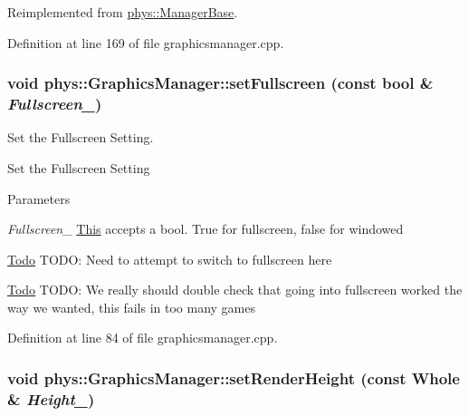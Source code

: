 Reimplemented from \hyperlink{classphys_1_1ManagerBase_afc3572602f96bdeb8215c386ff870820}{phys::ManagerBase}.



Definition at line 169 of file graphicsmanager.cpp.

\hypertarget{classphys_1_1GraphicsManager_aafcf1824190e44d42a9bfbea9cfbe1b2}{
\subsubsection[{setFullscreen}]{\setlength{\rightskip}{0pt plus 5cm}void phys::GraphicsManager::setFullscreen (const bool \& {\em Fullscreen\_\-})}}
\label{dd/d63/classphys_1_1GraphicsManager_aafcf1824190e44d42a9bfbea9cfbe1b2}


Set the Fullscreen Setting. 

Set the Fullscreen Setting 
\begin{DoxyParams}{Parameters}
\item[{\em Fullscreen\_\-}]\hyperlink{structThis}{This} accepts a bool. True for fullscreen, false for windowed \end{DoxyParams}


\begin{Desc}
\item[\hyperlink{todo__todo000009}{Todo}]TODO: Need to attempt to switch to fullscreen here \end{Desc}
\begin{Desc}
\item[\hyperlink{todo__todo000010}{Todo}]TODO: We really should double check that going into fullscreen worked the way we wanted, this fails in too many games \end{Desc}




Definition at line 84 of file graphicsmanager.cpp.

\hypertarget{classphys_1_1GraphicsManager_a8d59e9a8aa2ae7f520d388a4c70f0623}{
\subsubsection[{setRenderHeight}]{\setlength{\rightskip}{0pt plus 5cm}void phys::GraphicsManager::setRenderHeight (const {\bf Whole} \& {\em Height\_\-})}}
\label{dd/d63/classphys_1_1GraphicsManager_a8d59e9a8aa2ae7f520d388a4c70f0623}



